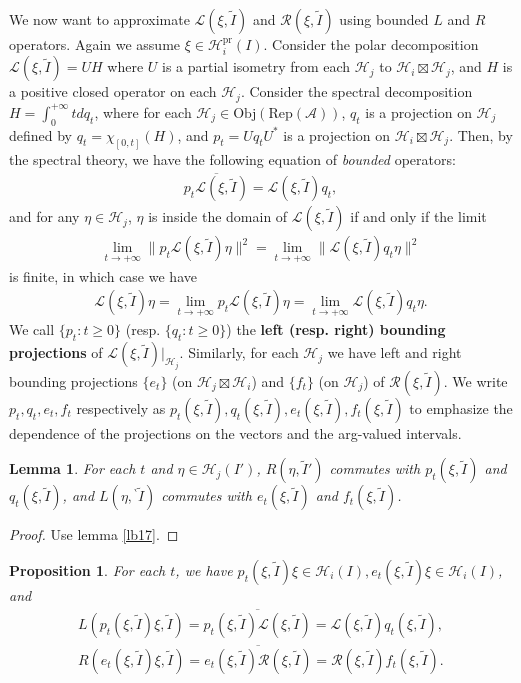 \documentclass[12pt,a4paper]{article}
\theoremstyle{definition}
\theoremstyle{plain}
\newtheorem{pp}[df]{Proposition}
\newtheorem{lm}[df]{Lemma}
\newcommand{\mc}{\mathcal}
\newcommand{\wtd}{\widetilde}
\newcommand{\ovl}{\overline}
\newcommand{\scr}{\mathscr}
\newcommand{\RepA}{\mathrm{Rep}(\mc A)}
\newcommand{\Obj}{\mathrm{Obj}}
\newcommand{\bpr}{{}^\backprime}
\newcommand{\pr}{\mathrm{pr}}
\numberwithin{equation}{subsection}
\begin{document}
We now want to approximate $\scr L(\xi,\wtd I)$ and $\scr R(\xi,\wtd I)$ using bounded $L$ and $R$ operators. Again we assume $\xi\in\mc H_i^\pr(I)$. Consider the polar decomposition $\scr L(\xi,\wtd I)=UH$ where $U$ is a partial isometry from each $\mc H_j$ to $\mc H_i\boxtimes\mc H_j$, and $H$ is a positive closed operator on each $\mc H_j$. Consider the spectral decomposition $H=\int_0^{+\infty}tdq_t$, where for each $\mc H_j\in\Obj(\RepA)$,  $q_t$ is a projection on $\mc H_j$ defined by $q_t=\chi_{[0,t]}(H)$, and $p_t=Uq_tU^*$  is a projection on $\mc H_i\boxtimes\mc H_j$. Then, by the spectral theory, we have the following equation of \emph{bounded} operators:
\begin{align*}
\ovl {p_t\scr L(\xi,\wtd I)}=\scr L(\xi,\wtd I)q_t,
\end{align*}
and for any $\eta\in\mc H_j$,  $\eta$ is inside the domain of $\scr L(\xi,\wtd I)$ if and only if the limit
\begin{align*}
\lim_{t\rightarrow+\infty}\lVert {p_t\scr L(\xi,\wtd I)}\eta \lVert^2=\lim_{t\rightarrow+\infty}\lVert {\scr L(\xi,\wtd I)}q_t\eta \lVert^2
\end{align*}
is finite, in which case we have
\begin{align*}
\scr L(\xi,\wtd I)\eta=\lim_{t\rightarrow+\infty} {p_t\scr L(\xi,\wtd I)}\eta =\lim_{t\rightarrow+\infty}{\scr L(\xi,\wtd I)}q_t\eta. 
\end{align*}
We call $\{p_t:t\geq0\}$ (resp. $\{q_t:t\geq0\}$) the \textbf{left (resp. right) bounding projections} of $\scr L(\xi,\wtd I)|_{\mc H_j}$.
Similarly, for each $\mc H_j$ we have left and right bounding projections $\{e_t\}$ (on $\mc H_j\boxtimes \mc H_i$)  and $\{f_t\}$ (on $\mc H_j$)  of $\scr R(\xi,\wtd I)$. We write $p_t,q_t,e_t,f_t$ respectively as $p_t(\xi,\wtd I),q_t(\xi,\wtd I),e_t(\xi,\wtd I),f_t(\xi,\wtd I)$ \index{pt@$p_t(\xi,\wtd I),q_t(\xi,\wtd I),e_t(\xi,\wtd I),f_t(\xi,\wtd I)$} to emphasize the dependence of the projections on the vectors and the arg-valued intervals.


\begin{lm}\label{lb19}
	For each $t$ and $\eta\in\mc H_j(I')$, $R(\eta,\wtd I')$ commutes with $p_t(\xi,\wtd I)$ and $q_t(\xi,\wtd I)$, and $L(\eta,\bpr\wtd I)$ commutes with $e_t(\xi,\wtd I)$ and $f_t(\xi,\wtd I)$.
\end{lm}
\begin{proof}
	Use lemma \ref{lb17}.
\end{proof}

\begin{pp}
	For each $t$, we have $p_t(\xi,\wtd I)\xi\in\mc H_i(I),e_t(\xi,\wtd I)\xi\in\mc H_i(I)$, and 
	\begin{gather}
	L(p_t(\xi,\wtd I)\xi,\wtd I)=\ovl{p_t(\xi,\wtd I)\scr L(\xi,\wtd I)}=\scr L(\xi,\wtd I)q_t(\xi,\wtd I),\\
	R(e_t(\xi,\wtd I)\xi,\wtd I)=\ovl{e_t(\xi,\wtd I)\scr R(\xi,\wtd I)}=\scr R(\xi,\wtd I)f_t(\xi,\wtd I).
	\end{gather}
\end{pp}
\end{document}
